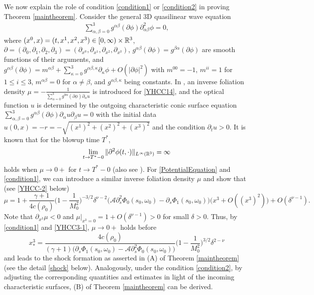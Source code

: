 \documentclass[11pt,twoside]{article}
\def\al{\alpha}
\def\be{\beta}
\def\f{\frac}
\def\p{\partial}
\def\dps{\displaystyle}
\begin{document}
\begin{remark}\label{Yin.4}
We now explain the role of condition \eqref{condition1} or  \eqref{condition2} in proving Theorem \ref{maintheorem}.
Consider the general 3D quasilinear wave equation
\begin{equation}\label{YHCC14}
\begin{split}
\dps\sum_{\al,\beta=0}^3g^{\al\beta}(\p\phi)\p_{\al\beta}^2\phi=0,
\end{split}
\end{equation}
where $(x^0, x)=(t, x^1, x^2, x^3)\in [0,\infty)\times\Bbb R^3$,
$\p=(\p_0,\p_1,\p_2,\p_3)=(\p_{x^0}, \p_{x^1}, \p_{x^2}, \p_{x^3})$,
$g^{\al\beta}(\p\phi) =g^{\beta\al}(\p\phi)$ are smooth
functions of their arguments, and $g^{\al\beta}(\p\phi)=m^{\al\beta}+\dps\sum_{\kappa=0}^3 g^{\al\beta,
\kappa}\p_\kappa\phi+O(|\p\phi|^2)$
with $m^{00}=-1$, $m^{ii}=1$ for $1\le i\le 3$, $m^{\al\beta}=0$ for $\al\neq\beta$, and
$g^{\al\beta,\kappa}$ being constants. In \cite{Ch1}, an inverse foliation density $\mu=-\dps\f{1}{\sum_{\al=0}^3g^{0\al}(\p\phi)\p_{\al}u}$ is introduced
for \eqref{YHCC14},
and the optical function $u$
is determined by the outgoing characteristic conic surface equation $\dps\sum_{\al,\beta=0}^3g^{\al\be}(\p\phi)\p_{\al}u\p_{\be}u=0$ with the initial data $u(0,x)=-r=-\sqrt{(x^1)^2+(x^2)^2+(x^3)^2}$ and the condition $\p_{t}u>0$.
It is known that for the blowup time $T^*$,
\begin{equation*}
\lim_{t\to T^*-0}\|\p^2\phi(t,\cdot)\|_{L^{\infty}(\Bbb R^3)}=\infty
\end{equation*}
holds when $\mu\to 0+$ for $t\to T^*-0$ (also see \cite{Ch3,Luk,Sp,M-Y}).
For \eqref{PotentialEquation} and \eqref{condition1}, we can introduce {a} similar inverse foliation density $\mu$
and show that (see \eqref{YHCC-2} below)
\begin{equation}\label{YHCC3-1}
\mu=1+\frac{\gamma+1}{4c(\rho_0)}\Big(1-\frac{1}{M_0^2}\Big)^{-3/2}\delta^{\nu-2}
\big(\mathcal A\partial_s^2\Phi_0(s_0,\omega_0)-\partial_s\Phi_1(s_0, \omega_0)\big)
\big(x^3+ O((x^3)^2)\big)+O(\delta^{\nu-1}).
\end{equation}
Note that $\p_{x^3}\mu<0$ and $\mu|_{x^3=0}=1+O(\delta^{\nu-1})>0$ for small $\delta>0$.
Thus, by \eqref{condition1} and \eqref{YHCC3-1},
$\mu\to 0+$ holds before
\[
x^3_*=\frac{4c(\rho_0)}{(\gamma+1)\big(\p_s\Phi_1(s_0,\omega_0)-\mathcal A\p_s^2\Phi_0(s_0,\omega_0)\big)}
\big(1-\frac{1}{M_0^2}\big)^{3/2}\delta^{2-\nu}
\]
and leads to the shock formation as asserted in (A) of Theorem \ref{maintheorem} (see the detail \eqref{shock} below).
Analogously, under the condition \eqref{condition2}, by adjusting the corresponding quantities and estimates
in light of the incoming characteristic surfaces, (B) of Theorem \ref{maintheorem} can be derived.
\end{remark}
\end{document}
